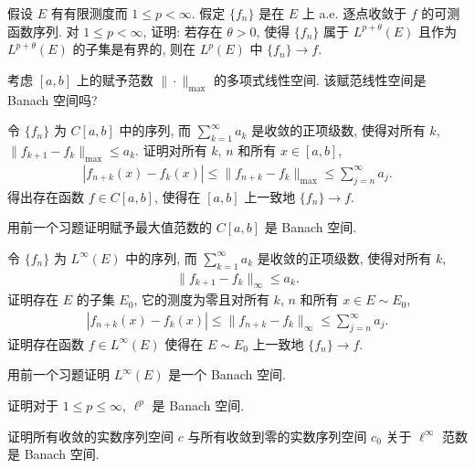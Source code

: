 \documentclass[../../main.tex]{subfiles}
\begin{document}
\begin{exercise}\label{exercise:ch07-28}
假设 $E$ 有有限测度而 $1\leqslant p<\infty$. 假定 $\{f_{n}\}$ 是在 $E$ 上 a.e. 逐点收敛于 $f$ 的可测函数序列. 对 $1\leqslant p<\infty$, 证明: 若存在 $\theta>0$, 使得 $\{f_{n}\}$ 属于 $L^{p+\theta}(E)$ 且作为 $L^{p+\theta}(E)$ 的子集是有界的, 则在 $L^{p}(E)$ 中 $\{f_{n}\}\to f$.
\end{exercise}

\begin{exercise}\label{exercise:ch07-29}
考虑 $[a,b]$ 上的赋予范数 $\|\cdot\|_{\max}$ 的多项式线性空间. 该赋范线性空间是 Banach 空间吗?
\end{exercise}

\begin{exercise}\label{exercise:ch07-30}
令 $\{f_{n}\}$ 为 $C[a,b]$ 中的序列, 而 $\sum_{k=1}^{\infty}a_{k}$ 是收敛的正项级数, 使得对所有 $k$, $\|f_{k+1}-f_{k}\|_{\max}\leqslant a_{k}$. 证明对所有 $k$, $n$ 和所有 $x\in[a,b]$,
\begin{align*}
|f_{n+k}(x)-f_{k}(x)|\leqslant\|f_{n+k}-f_{k}\|_{\max}\leqslant\sum_{j=n}^{\infty}a_{j}.
\end{align*}
得出存在函数 $f\in C[a,b]$, 使得在 $[a,b]$ 上一致地 $\{f_{n}\}\to f$.
\end{exercise}

\begin{exercise}\label{exercise:ch07-31}
用前一个习题证明赋予最大值范数的 $C[a,b]$ 是 Banach 空间.
\end{exercise}

\begin{exercise}\label{exercise:ch07-32}
令 $\{f_{n}\}$ 为 $L^{\infty}(E)$ 中的序列, 而 $\sum_{k=1}^{\infty}a_{k}$ 是收敛的正项级数, 使得对所有 $k$,
\begin{align*}
\|f_{k+1}-f_{k}\|_{\infty}\leqslant a_{k}.
\end{align*}
证明存在 $E$ 的子集 $E_{0}$, 它的测度为零且对所有 $k$, $n$ 和所有 $x\in E\sim E_{0}$,
\begin{align*}
|f_{n+k}(x)-f_{k}(x)|\leqslant\|f_{n+k}-f_{k}\|_{\infty}\leqslant\sum_{j=n}^{\infty}a_{j}.
\end{align*}
证明存在函数 $f\in L^{\infty}(E)$ 使得在 $E\sim E_{0}$ 上一致地 $\{f_{n}\}\to f$.
\end{exercise}

\begin{exercise}\label{exercise:ch07-33}
用前一个习题证明 $L^{\infty}(E)$ 是一个 Banach 空间.
\end{exercise}

\begin{exercise}\label{exercise:ch07-34}
证明对于 $1\leqslant p\leqslant\infty$, $\ell^{p}$ 是 Banach 空间.
\end{exercise}

\begin{exercise}\label{exercise:ch07-35}
证明所有收敛的实数序列空间 $c$ 与所有收敛到零的实数序列空间 $c_{0}$ 关于 $\ell^{\infty}$ 范数是 Banach 空间.
\end{exercise}
\end{document}
